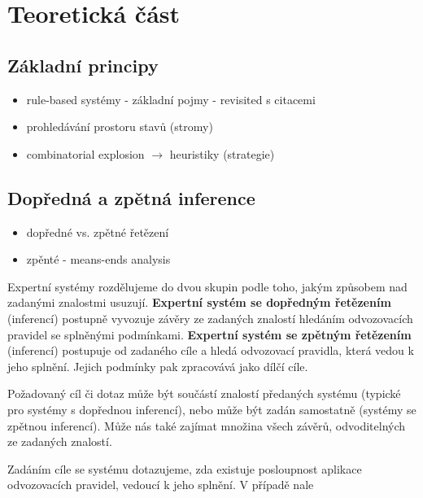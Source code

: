\section{Teoretická část}



\subsection{Základní principy}
\begin{framed}
  \begin{itemize}
    \item rule-based systémy - základní pojmy - revisited s citacemi
    \item prohledávání prostoru stavů (stromy)
    \item combinatorial explosion $\rightarrow$ heuristiky (strategie)
  \end{itemize}
\end{framed}

\subsection{Dopředná a zpětná inference}
\begin{framed}
  \begin{itemize}
    \item dopředné vs. zpětné řetězení
    \item zpěnté - means-ends analysis
  \end{itemize}
\end{framed}

Expertní systémy rozdělujeme do dvou skupin podle toho, jakým způsobem nad
zadanými znalostmi usuzují. \textbf{Expertní systém se dopředným řetězením}
(inferencí) postupně vyvozuje závěry ze zadaných znalostí hledáním odvozovacích
pravidel se splněnými podmínkami. \textbf{Expertní systém se zpětným řetězením}
(inferencí) postupuje od zadaného cíle a hledá odvozovací pravidla, která vedou
k jeho splnění. Jejich podmínky pak zpracovává jako dílčí cíle.

Požadovaný cíl či dotaz může být součástí znalostí předaných systému (typické
pro systémy s dopřednou inferencí), nebo může být zadán samostatně (systémy se
zpětnou inferencí). Může nás také zajímat množina všech závěrů, odvoditelných ze
zadaných znalostí.

Zadáním cíle se systému dotazujeme, zda existuje posloupnost aplikace
odvozovacích pravidel, vedoucí k jeho splnění. V případě nale

